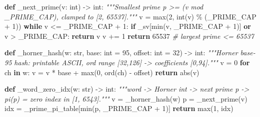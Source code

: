 \documentclass[
  10pt,
]{article}
\newenvironment{Shaded}{}{}
\newcommand{\BuiltInTok}[1]{\textcolor[rgb]{0.00,0.50,0.00}{#1}}
\newcommand{\CommentTok}[1]{\textcolor[rgb]{0.38,0.63,0.69}{\textit{#1}}}
\newcommand{\ControlFlowTok}[1]{\textcolor[rgb]{0.00,0.44,0.13}{\textbf{#1}}}
\newcommand{\DecValTok}[1]{\textcolor[rgb]{0.25,0.63,0.44}{#1}}
\newcommand{\KeywordTok}[1]{\textcolor[rgb]{0.00,0.44,0.13}{\textbf{#1}}}
\newcommand{\NormalTok}[1]{#1}
\newcommand{\OperatorTok}[1]{\textcolor[rgb]{0.40,0.40,0.40}{#1}}
\begin{document}
\begin{Shaded}
\begin{Highlighting}[]
\KeywordTok{def}\NormalTok{ \_next\_prime(v: }\BuiltInTok{int}\NormalTok{) }\OperatorTok{{-}\textgreater{}} \BuiltInTok{int}\NormalTok{:}
    \CommentTok{"""Smallest prime p \textgreater{}= (v mod \_PRIME\_CAP), clamped to [2, 65537]."""}
\NormalTok{    v }\OperatorTok{=} \BuiltInTok{max}\NormalTok{(}\DecValTok{2}\NormalTok{, }\BuiltInTok{int}\NormalTok{(v) }\OperatorTok{\%}\NormalTok{ (\_PRIME\_CAP }\OperatorTok{+} \DecValTok{1}\NormalTok{))}
    \ControlFlowTok{while}\NormalTok{ v }\OperatorTok{\textless{}=}\NormalTok{ \_PRIME\_CAP }\OperatorTok{+} \DecValTok{1}\NormalTok{:}
        \ControlFlowTok{if}\NormalTok{ \_sv[}\BuiltInTok{min}\NormalTok{(v, \_PRIME\_CAP }\OperatorTok{+} \DecValTok{1}\NormalTok{)] }\KeywordTok{or}\NormalTok{ v }\OperatorTok{\textgreater{}}\NormalTok{ \_PRIME\_CAP:}
            \ControlFlowTok{return}\NormalTok{ v}
\NormalTok{        v }\OperatorTok{+=} \DecValTok{1}
    \ControlFlowTok{return} \DecValTok{65537}   \CommentTok{\# largest prime \textless{}= 65537}

\KeywordTok{def}\NormalTok{ \_horner\_hash(w: }\BuiltInTok{str}\NormalTok{, base: }\BuiltInTok{int} \OperatorTok{=} \DecValTok{95}\NormalTok{, offset: }\BuiltInTok{int} \OperatorTok{=} \DecValTok{32}\NormalTok{) }\OperatorTok{{-}\textgreater{}} \BuiltInTok{int}\NormalTok{:}
    \CommentTok{"""Horner base{-}95 hash: printable ASCII, ord range [32,126] {-}\textgreater{} coefficients [0,94]."""}
\NormalTok{    v }\OperatorTok{=} \DecValTok{0}
    \ControlFlowTok{for}\NormalTok{ ch }\KeywordTok{in}\NormalTok{ w:}
\NormalTok{        v }\OperatorTok{=}\NormalTok{ v }\OperatorTok{*}\NormalTok{ base }\OperatorTok{+} \BuiltInTok{max}\NormalTok{(}\DecValTok{0}\NormalTok{, }\BuiltInTok{ord}\NormalTok{(ch) }\OperatorTok{{-}}\NormalTok{ offset)}
    \ControlFlowTok{return} \BuiltInTok{abs}\NormalTok{(v)}

\KeywordTok{def}\NormalTok{ \_word\_zero\_idx(w: }\BuiltInTok{str}\NormalTok{) }\OperatorTok{{-}\textgreater{}} \BuiltInTok{int}\NormalTok{:}
    \CommentTok{"""word {-}\textgreater{} Horner int {-}\textgreater{} next prime p {-}\textgreater{} pi(p) = zero index in [1, 6543]."""}
\NormalTok{    v }\OperatorTok{=}\NormalTok{ \_horner\_hash(w)}
\NormalTok{    p }\OperatorTok{=}\NormalTok{ \_next\_prime(v)}
\NormalTok{    idx }\OperatorTok{=}\NormalTok{ \_prime\_pi\_table[}\BuiltInTok{min}\NormalTok{(p, \_PRIME\_CAP }\OperatorTok{+} \DecValTok{1}\NormalTok{)]}
    \ControlFlowTok{return} \BuiltInTok{max}\NormalTok{(}\DecValTok{1}\NormalTok{, idx)}
\end{Highlighting}
\end{Shaded}
\end{document}
